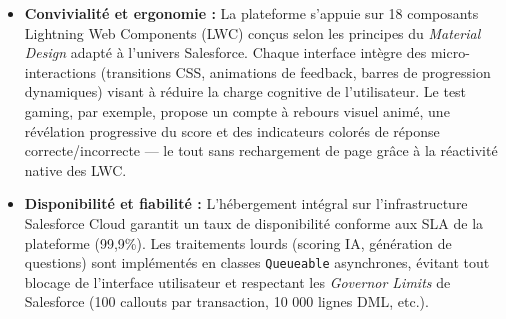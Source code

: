 \begin{itemize}
    \item \textbf{Convivialité et ergonomie :} La plateforme s'appuie sur 18 composants Lightning Web Components (LWC) conçus selon les principes du \textit{Material Design} adapté à l'univers Salesforce. Chaque interface intègre des micro-interactions (transitions CSS, animations de feedback, barres de progression dynamiques) visant à réduire la charge cognitive de l'utilisateur. Le test gaming, par exemple, propose un compte à rebours visuel animé, une révélation progressive du score et des indicateurs colorés de réponse correcte/incorrecte — le tout sans rechargement de page grâce à la réactivité native des LWC.

    \item \textbf{Disponibilité et fiabilité :} L'hébergement intégral sur l'infrastructure Salesforce Cloud garantit un taux de disponibilité conforme aux SLA de la plateforme (99,9\%). Les traitements lourds (scoring IA, génération de questions) sont implémentés en classes \texttt{Queueable} asynchrones, évitant tout blocage de l'interface utilisateur et respectant les \textit{Governor Limits} de Salesforce (100 callouts par transaction, 10 000 lignes DML, etc.).


\end{itemize}
